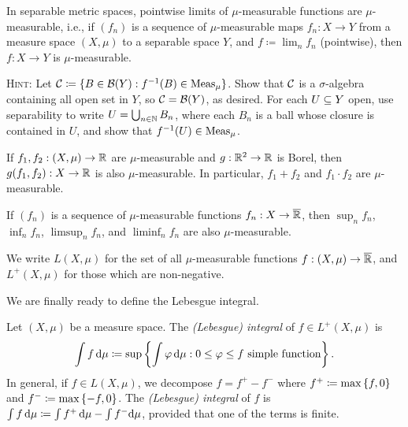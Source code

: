 \documentclass[reqno, twoside]{article}
\begin{document}
    \begin{exercise}
        In separable metric spaces, pointwise limits of $\mu$-measurable functions are $\mu$-measurable, i.e., if $(f_n)$ is a sequence of $\mu$-measurable maps $f_n:X\to Y$ from a measure space $(X,\mu)$ to a separable space $Y$, and $f\coloneqq\lim_nf_n$ (pointwise), then $f:X\to Y$ is $\mu$-measurable.

        \textsc{Hint:} Let $\mathcal{C}\coloneqq\{B\in\mathcal{B}(Y): f^{-1}(B)\in\operatorname{Meas}_\mu\}$. Show that $\mathcal{C}$ is a $\sigma$-algebra containing all open set in $Y$, so $\mathcal{C}=\mathcal{B}(Y)$, as desired. For each $U\subseteq Y$ open, use separability to write $U=\bigcup_{n\in\mathbb{N}}B_n$, where each $B_n$ is a ball whose closure is contained in $U$, and show that $f^{-1}(U)\in\operatorname{Meas}_\mu$.
    \end{exercise}

    \begin{exercise}
        If $f_1,f_2:(X,\mu)\to\mathbb{R}$ are $\mu$-measurable and $g:\mathbb{R}^2\to\mathbb{R}$ is Borel, then $g(f_1,f_2):X\to\mathbb{R}$ is also $\mu$-measurable. In particular, $f_1+f_2$ and $f_1\cdot f_2$ are $\mu$-measurable.
    \end{exercise}

    \begin{exercise}
        If $(f_n)$ is a sequence of $\mu$-measurable functions $f_n:X\to\overline{\mathbb{R}}$, then $\sup_nf_n$, $\inf_nf_n$, $\limsup_nf_n$, and $\liminf_nf_n$ are also $\mu$-measurable.
    \end{exercise}

    \begin{notation}
        We write $L(X,\mu)$ for the set of all $\mu$-measurable functions $f:(X,\mu)\to\overline{\mathbb{R}}$, and $L^+(X,\mu)$ for those which are non-negative.
    \end{notation}

    We are finally ready to define the Lebesgue integral.

    \begin{definition}
        Let $(X,\mu)$ be a measure space. The \textit{(Lebesgue) integral} of $f\in L^+(X,\mu)$ is
        \vspace{-0.05in}
        \begin{equation*}
            \int f\,\d\mu\coloneqq\sup\l\{\int\phi\,\d\mu\st0\leq\phi\leq f\textrm{ simple function}\r\}.
            \vspace{-0.05in}
        \end{equation*}
        In general, if $f\in L(X,\mu)$, we decompose $f=f^+-f^-$ where $f^+\coloneqq\max\left\{f,0\right\}$ and $f^-\coloneqq\max\left\{-f,0\right\}$. The \textit{(Lebesgue) integral} of $f$ is $\int f\,\mathrm{d}\mu\coloneqq\int f^+\,\mathrm{d}\mu-\int f^-\mathrm{d}\mu$, provided that one of the terms is finite.
    \end{definition}
\end{document}
